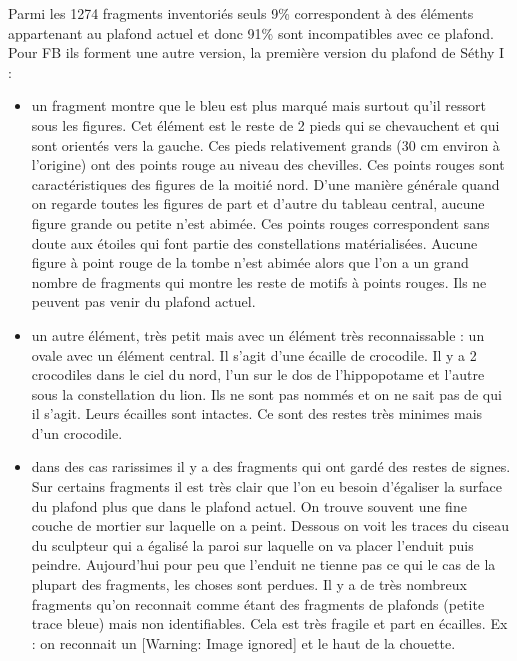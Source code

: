 \documentclass{article}
\begin{document}
Parmi les 1274 fragments inventoriés seuls 9\% correspondent à des
éléments appartenant au plafond actuel et donc 91\% sont incompatibles
avec ce plafond. Pour FB ils forment une autre version, la première
version du plafond de Séthy I : 

\begin{itemize}
\item un fragment montre que le bleu est plus marqué mais surtout qu’il
ressort sous les figures. Cet élément est le reste de 2 pieds qui se
chevauchent et qui sont orientés vers la gauche. Ces pieds relativement
grands (30 cm environ à l’origine) ont des points rouge au niveau des
chevilles. Ces points rouges sont caractéristiques des figures de la
moitié nord. D’une manière générale quand on regarde toutes les figures
de part et d’autre du tableau central, aucune figure grande ou petite
n’est abimée. Ces points rouges correspondent sans doute aux étoiles
qui font partie des constellations matérialisées. Aucune figure à point
rouge de la tombe n’est abimée alors que l’on a un grand nombre de
fragments qui montre les reste de motifs à points rouges. Ils ne
peuvent pas venir du plafond actuel.
\end{itemize}
\begin{itemize}
\item  un autre élément, très petit mais avec un élément très
reconnaissable : un ovale avec un élément central. Il s’agit d’une
écaille de crocodile. Il y a 2 crocodiles dans le ciel du nord, l’un
sur le dos de l’hippopotame et l’autre sous la constellation du lion. 
Ils ne sont pas nommés et on ne sait pas de qui il s’agit. Leurs
écailles sont intactes. Ce sont des restes très minimes mais d’un
crocodile.
\end{itemize}
\begin{itemize}
\item  dans des cas rarissimes il y a des fragments qui ont gardé des
restes de signes. Sur certains fragments il est très clair que l’on eu
besoin d’égaliser la surface du plafond plus que dans le plafond
actuel. On trouve souvent une fine couche de mortier sur laquelle on a
peint. Dessous on voit les traces du ciseau du sculpteur qui a égalisé
la paroi sur laquelle on va placer l’enduit puis peindre. Aujourd’hui
pour peu que l’enduit ne tienne pas ce qui le cas de la plupart des
fragments, les choses sont perdues. Il y a de très nombreux fragments
qu’on reconnait comme étant des fragments de plafonds (petite trace
bleue) mais non identifiables. Cela est très fragile et part en
écailles. Ex : on reconnait  un   [Warning: Image ignored]
   et le haut de la chouette. 
\end{itemize}
\end{document}
